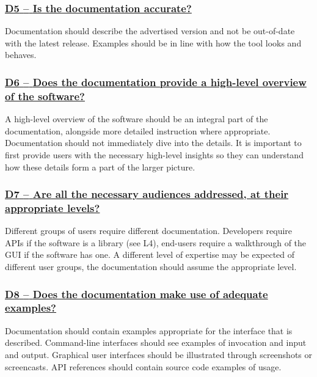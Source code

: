 \documentclass[a4paper,11pt]{article}
\newcommand{\indicator}[1]{\subsubsection*{\underline{#1}}}
\begin{document}
\newcommand{\dFiveName}{D5}
\newcommand{\dFiveID}{\dFiveName}
\newcommand{\dFiveText}{Is the documentation accurate?}
\indicator{\dFiveName{ }--{ }\dFiveText}\label{id:d5}

Documentation should describe the advertised version and not be out-of-date
with the latest release. Examples should be in line with how the tool looks and
behaves.

\newcommand{\dSixName}{D6}
\newcommand{\dSixID}{\dSixName}
\newcommand{\dSixText}{Does the documentation provide a high-level overview of the software?}
\indicator{\dSixName{ }--{ }\dSixText}\label{id:d6}

A high-level overview of the software should be an integral part of the
documentation, alongside more detailed instruction where appropriate.
Documentation should not immediately dive into the details. It is important to
first provide users with the necessary high-level insights so they can understand how
these details form a part of the larger picture.


\newcommand{\dSevenName}{D7}
\newcommand{\dSevenID}{\dSevenName}
\newcommand{\dSevenText}{Are all the necessary audiences addressed, at their appropriate levels?}
\indicator{\dSevenName{ }--{ }\dSevenText}\label{id:d7}

Different groups of users require different documentation. Developers require
APIs if the software is a library (see L4), end-users require a walkthrough of the GUI
if the software has one. A different level of expertise may be expected of
different user groups, the documentation should assume the appropriate level.

\newcommand{\dEightName}{D8}
\newcommand{\dEightID}{\dEightName}
\newcommand{\dEightText}{Does the documentation make use of adequate examples?}
\indicator{\dEightName{ }--{ }\dEightText}\label{id:d8}

Documentation should contain examples appropriate for the interface that is
described. Command-line interfaces should see examples of invocation and input
and output. Graphical user interfaces should be illustrated through screenshots or
screencasts. API references should contain source code examples of usage.
\end{document}
